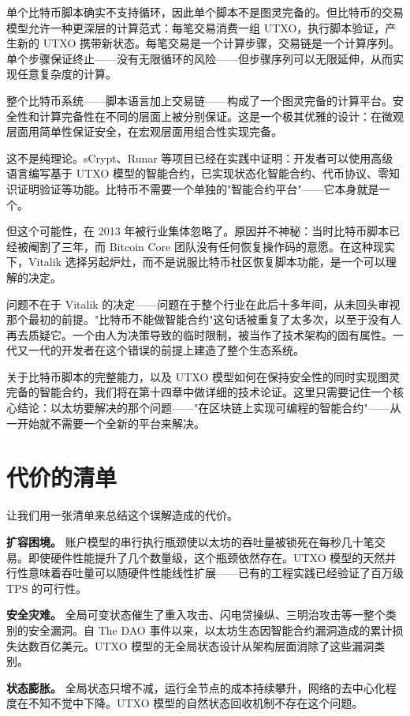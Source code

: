 \documentclass[a4paper,12pt,openany]{ctexbook}
\begin{document}
单个比特币脚本确实不支持循环，因此单个脚本不是图灵完备的。但比特币的交易模型允许一种更深层的计算范式：每笔交易消费一组 UTXO，执行脚本验证，产生新的 UTXO 携带新状态。每笔交易是一个计算步骤，交易链是一个计算序列。单个步骤保证终止——没有无限循环的风险——但步骤序列可以无限延伸，从而实现任意复杂度的计算。

整个比特币系统——脚本语言加上交易链——构成了一个图灵完备的计算平台。安全性和计算完备性在不同的层面上被分别保证。这是一个极其优雅的设计：在微观层面用简单性保证安全，在宏观层面用组合性实现完备。

这不是纯理论。sCrypt、Runar 等项目已经在实践中证明：开发者可以使用高级语言编写基于 UTXO 模型的智能合约，已实现状态化智能合约、代币协议、零知识证明验证等功能。比特币不需要一个单独的"智能合约平台"——它本身就是一个。

但这个可能性，在 2013 年被行业集体忽略了。原因并不神秘：当时比特币脚本已经被阉割了三年，而 Bitcoin Core 团队没有任何恢复操作码的意愿。在这种现实下，Vitalik 选择另起炉灶，而不是说服比特币社区恢复脚本功能，是一个可以理解的决定。

问题不在于 Vitalik 的决定——问题在于整个行业在此后十多年间，从未回头审视那个最初的前提。"比特币不能做智能合约"这句话被重复了太多次，以至于没有人再去质疑它。一个由人为决策导致的临时限制，被当作了技术架构的固有属性。一代又一代的开发者在这个错误的前提上建造了整个生态系统。

关于比特币脚本的完整能力，以及 UTXO 模型如何在保持安全性的同时实现图灵完备的智能合约，我们将在第十四章中做详细的技术论证。这里只需要记住一个核心结论：以太坊要解决的那个问题——"在区块链上实现可编程的智能合约"——从一开始就不需要一个全新的平台来解决。


\section*{代价的清单}


让我们用一张清单来总结这个误解造成的代价。

\textbf{扩容困境。} 账户模型的串行执行瓶颈使以太坊的吞吐量被锁死在每秒几十笔交易。即使硬件性能提升了几个数量级，这个瓶颈依然存在。UTXO 模型的天然并行性意味着吞吐量可以随硬件性能线性扩展——已有的工程实践已经验证了百万级 TPS 的可行性。

\textbf{安全灾难。} 全局可变状态催生了重入攻击、闪电贷操纵、三明治攻击等一整个类别的安全漏洞。自 The DAO 事件以来，以太坊生态因智能合约漏洞造成的累计损失达数百亿美元。UTXO 模型的无全局状态设计从架构层面消除了这些漏洞类别。

\textbf{状态膨胀。} 全局状态只增不减，运行全节点的成本持续攀升，网络的去中心化程度在不知不觉中下降。UTXO 模型的自然状态回收机制不存在这个问题。
\end{document}
